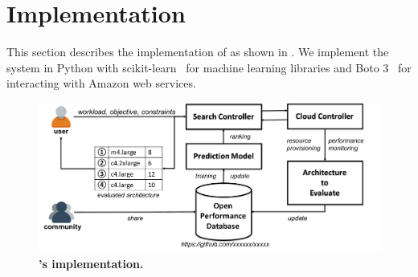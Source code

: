 \section{Implementation}
\label{sec:system}

This section describes the implementation of \scout
as shown in \myfigure{\ref{fig:system_design}}.
We implement the system in Python with
scikit-learn~\cite{scikit-learn} for machine learning libraries and
Boto 3~\cite{boto3} for interacting with Amazon web services.


\begin{figure}[!htbp]
 \includegraphics[width=.8\textwidth]{figures/system_design_blind.pdf}
 \centering
 \caption{\small{\textbf{\scout's implementation.}
 }}
 \label{fig:system_design}
\end{figure}


